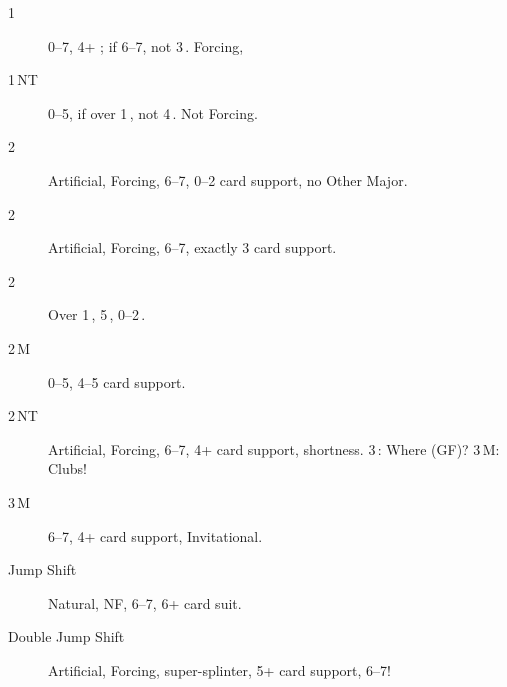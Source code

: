 \documentclass[12pt]{article}
\begin{document}
\begin{footnotesize}
\begin{enumerate}
        \begin{description}
            \item [1\,\bs] 0--7, 4+ \bs; if 6--7, not 3\,\rh.
            Forcing,
            \item [1\,NT] 0--5, if over 1\,\rh, not 4\,\bs.
            Not Forcing.
            \item [2\,\bc] Artificial, Forcing, 6--7, 0--2 card support, no Other Major.
            \item [2\,\rd] Artificial, Forcing, 6--7, exactly 3 card support.
            \item [2\,\rh] Over 1\,\bs, 5\,\rh, 0--2\,\bs.
            \item [2\,M] 0--5, 4--5 card support.
            \item [2\,NT] Artificial, Forcing, 6--7, 4+ card support, shortness.
            3\,\bc: Where (GF)?
            3\,M: Clubs!
            \item[3\,M] 6--7, 4+ card support, Invitational.
            \item[Jump Shift] Natural, NF, 6--7, 6+ card suit.
            \item[Double Jump Shift] Artificial, Forcing, super-splinter, 5+ card support, 6--7!
        \end{description}
    \end{enumerate}
\end{footnotesize}
\end{document}
